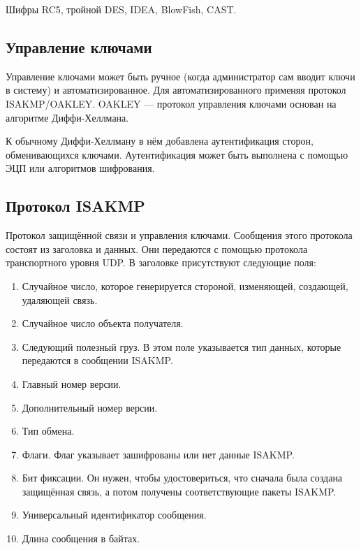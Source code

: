 \documentclass[12pt, russian, oneside, article]{ncc}
\begin{document}
Шифры RC5, тройной DES, IDEA, BlowFish, CAST.
\subsection{Управление ключами}
\label{sec-4_3}


Управление ключами может быть ручное (когда администратор сам вводит ключи в систему) и автоматизированное. Для автоматизированного применяя протокол ISAKMP/OAKLEY. OAKLEY --- протокол управления ключами основан на алгоритме Диффи-Хеллмана.

К обычному Диффи-Хеллману в нём добавлена аутентификация сторон, обменивающихся ключами. Аутентификация может быть выполнена с помощью ЭЦП или алгоритмов шифрования.
\subsection{Протокол ISAKMP}
\label{sec-4_4}


Протокол защищённой связи и управления ключами. Сообщения этого протокола состоят из заголовка и данных. Они передаются с помощью протокола транспортного уровня UDP. В заголовке присутствуют следующие поля:
\begin{enumerate}
\item Случайное число, которое генерируется стороной, изменяющей, создающей, удаляющей связь.
\item Случайное число объекта получателя.
\item Следующий полезный груз. В этом поле указывается тип данных, которые передаются в сообщении ISAKMP.
\item Главный номер версии.
\item Дополнительный номер версии.
\item Тип обмена.
\item Флаги. Флаг указывает зашифрованы или нет данные ISAKMP.
\item Бит фиксации. Он нужен, чтобы удостовериться, что сначала была создана защищённая связь, а потом получены соответствующие пакеты ISAKMP.
\item Универсальный идентификатор сообщения.
\item Длина сообщения в байтах.
\end{enumerate}
\end{document}
